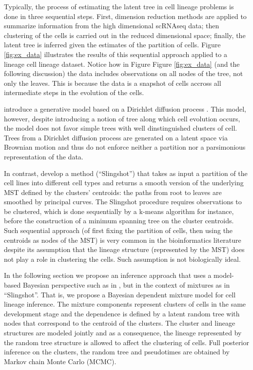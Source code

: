Typically, the process of estimating the latent tree in cell lineage problems is done in three sequential steps. First,  dimension reduction methods are applied to summarize information from the high dimensional scRNAseq data; then clustering of the cells is carried out in the reduced dimensional space; finally, the latent tree is inferred given the estimates of the partition of cells. Figure \ref{fig:ex_data} illustrates the results of this sequential approach applied to a lineage cell lineage dataset. Notice how in Figure Figure \ref{fig:ex_data} (and the following discussion) the data includes observations on all nodes of the tree, not only the leaves. This is because the data is a snapshot of cells accross all intermediate steps in the evolution of the cells.

\cite{Shiffman18} introduce a generative model based on a Dirichlet diffusion process \citep{neal:03}. 
This model, however, despite introducing a notion of tree along which cell evolution occurs, the model does not favor simple trees with well dinstinguished clusters of cell. Trees from a Dirichlet diffusion process are generated on a latent space via Brownian motion and thus do not enforce neither a partition nor a parsimonious representation of the data. 

In contrast, \cite{street2018} develop a method (``Slingshot'') that takes as input a partition of the cell lines into different cell types and returns a smooth version of the underlying MST defined by the clusters' centroids: the paths from root to leaves are smoothed by principal curves. The Slingshot procedure requires observations to be clustered, which is done sequentially by a k-means algorithm for instance, before the construction of a minimum spanning tree on the cluster centroids. Such sequential approach (of first fixing the partition of cells, then using the centroids as nodes of the MST) is very common in the bioinformatics literature despite its assumption that the lineage structure (represented by the MST) does not play a role in clustering the cells. Such assumption is not biologically ideal.


In the following section we propose an inference approach that uses a model-based Bayesian perspective such as in \cite{Shiffman18}, but in the context of mixtures as in ``Slingshot''.
That is, we propose a Bayesian dependent mixture model for cell lineage inference. 
The mixture components represent clusters of cells in the same development stage and the dependence is defined by a latent random tree with nodes that correspond to the centroid of the clusters. The cluster and lineage structures are modeled jointly and as a consequence, the lineage represented by the random tree structure is allowed to affect the clustering of cells. 
Full posterior inference on the clusters, the random tree and pseudotimes are obtained by Markov chain Monte Carlo (MCMC). 


